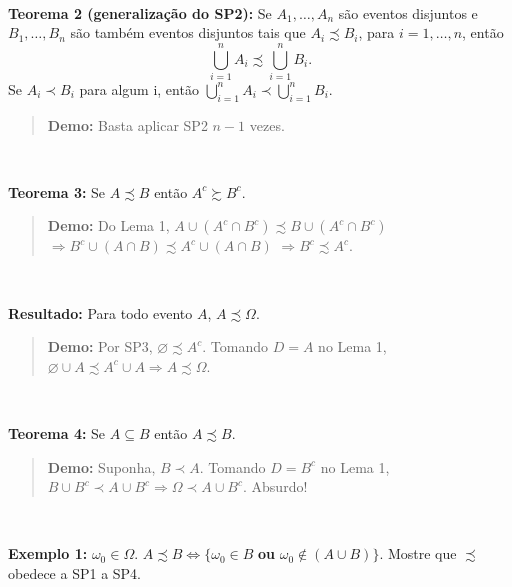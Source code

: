 \documentclass[
]{book}
\begin{document}
\(~\)

\textbf{Teorema 2 (generalização do SP2):}
Se \(A_1, \ldots, A_n\) são eventos disjuntos e \(B_1, \ldots, B_n\) são também eventos disjuntos tais que \(A_i \precsim B_i\), para \(i=1,\ldots,n\), então \[\bigcup_{i=1}^{n} A_i \precsim \bigcup_{i=1}^{n} B_i.\]
Se \(A_i \prec B_i\) para algum i, então \(\bigcup_{i=1}^{n} A_i \prec \bigcup_{i=1}^{n} B_i.\)

\begin{quote}
\textbf{Demo:} Basta aplicar SP2 \(n-1\) vezes.
\end{quote}

\(~\)

\textbf{Teorema 3:}
Se \(A \precsim B\) então \(A^c \succsim B^c\).

\begin{quote}
\textbf{Demo:} Do Lema 1, \(A \cup (A^c \cap B^c) \precsim B \cup (A^c \cap B^c)\) \(\Rightarrow B^c \cup (A \cap B) \precsim A^c \cup (A \cap B)\) \(\Rightarrow B^c \precsim A^c\).
\end{quote}

\(~\)

\textbf{Resultado:} Para todo evento \(A\), \(A \precsim \Omega\).

\begin{quote}
\textbf{Demo:} Por SP3, \(\varnothing \precsim A^c\). Tomando \(D=A\) no Lema 1, \(\varnothing \cup A \precsim A^c \cup A \Rightarrow A \precsim \Omega\).
\end{quote}

\(~\)

\textbf{Teorema 4:}
Se \(A \subseteq B\) então \(A \precsim B\).

\begin{quote}
\textbf{Demo:} Suponha, \(B \prec A\). Tomando \(D=B^c\) no Lema 1, \(B \cup B^c \prec A \cup B^c \Rightarrow \Omega \prec A \cup B^c\). Absurdo!
\end{quote}

\(~\)

\textbf{Exemplo 1:} \(\omega_0 \in \Omega\). \(A \precsim B \Leftrightarrow \{\omega_0 \in B\) \textbf{ou} \(\omega_0 \notin (A \cup B)\}\). Mostre que \(\precsim\) obedece a SP1 a SP4.
\end{document}
